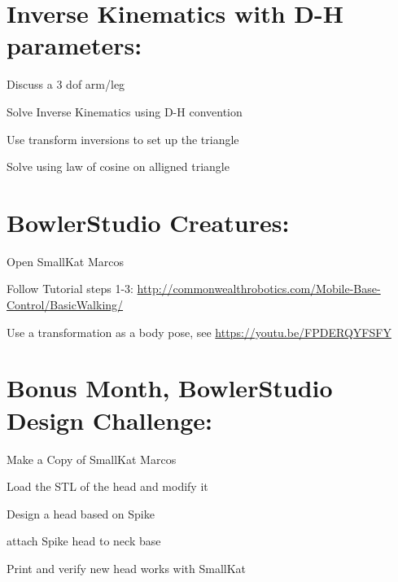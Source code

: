 \documentclass{article}
\begin{document}
\section{Inverse Kinematics with D-H parameters:}
\begin{todolist}
	\item Discuss a 3 dof arm/leg
	\item Solve Inverse Kinematics using D-H convention
	\item Use transform inversions to set up the triangle 
	\item Solve using law of cosine on alligned triangle
\end{todolist}


\section{BowlerStudio Creatures:}
\begin{todolist}
	\item Open SmallKat Marcos
	\item Follow Tutorial steps 1-3:  \url{http://commonwealthrobotics.com/Mobile-Base-Control/BasicWalking/}
	\item Use a transformation as a body pose, see  \url{https://youtu.be/FPDERQYFSFY}
\end{todolist}


\section{Bonus Month, BowlerStudio Design Challenge:}
\begin{todolist}
	\item Make a Copy of SmallKat Marcos
	\item Load the STL of the head and modify it
	\item Design a head based on Spike
	\item attach Spike head to neck base
	\item Print and verify new head works with SmallKat
\end{todolist}

\newpage
\end{document}
